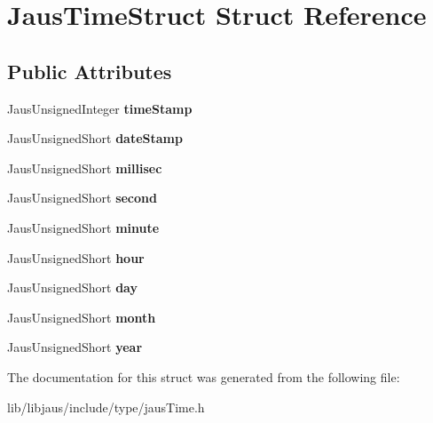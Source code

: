 \hypertarget{struct_jaus_time_struct}{\section{\-Jaus\-Time\-Struct \-Struct \-Reference}
\label{struct_jaus_time_struct}
}
\subsection*{\-Public \-Attributes}
\begin{DoxyCompactItemize}
\item 
\hypertarget{struct_jaus_time_struct_a82ba26a6bb3bb985523fababeae29d81}{\-Jaus\-Unsigned\-Integer {\bfseries time\-Stamp}}\label{struct_jaus_time_struct_a82ba26a6bb3bb985523fababeae29d81}

\item 
\hypertarget{struct_jaus_time_struct_ac4fcc4d01b47ac2499cf04eb2d14e44d}{\-Jaus\-Unsigned\-Short {\bfseries date\-Stamp}}\label{struct_jaus_time_struct_ac4fcc4d01b47ac2499cf04eb2d14e44d}

\item 
\hypertarget{struct_jaus_time_struct_a1d202afc258ba1c214dc7af2eeb894d9}{\-Jaus\-Unsigned\-Short {\bfseries millisec}}\label{struct_jaus_time_struct_a1d202afc258ba1c214dc7af2eeb894d9}

\item 
\hypertarget{struct_jaus_time_struct_afe63f8e9ad064bab7132d67e0407fcc1}{\-Jaus\-Unsigned\-Short {\bfseries second}}\label{struct_jaus_time_struct_afe63f8e9ad064bab7132d67e0407fcc1}

\item 
\hypertarget{struct_jaus_time_struct_a583cfb3ad1bf1a51ac972714ff051f52}{\-Jaus\-Unsigned\-Short {\bfseries minute}}\label{struct_jaus_time_struct_a583cfb3ad1bf1a51ac972714ff051f52}

\item 
\hypertarget{struct_jaus_time_struct_ab1562d7a1876ed04d388716587e35ab6}{\-Jaus\-Unsigned\-Short {\bfseries hour}}\label{struct_jaus_time_struct_ab1562d7a1876ed04d388716587e35ab6}

\item 
\hypertarget{struct_jaus_time_struct_ac0b2d9273125ed2bf057edac8ae95df1}{\-Jaus\-Unsigned\-Short {\bfseries day}}\label{struct_jaus_time_struct_ac0b2d9273125ed2bf057edac8ae95df1}

\item 
\hypertarget{struct_jaus_time_struct_a12c7298788d574ce43adcf3d13875874}{\-Jaus\-Unsigned\-Short {\bfseries month}}\label{struct_jaus_time_struct_a12c7298788d574ce43adcf3d13875874}

\item 
\hypertarget{struct_jaus_time_struct_af7b6de9a57a99d6035c9a9826dea65b2}{\-Jaus\-Unsigned\-Short {\bfseries year}}\label{struct_jaus_time_struct_af7b6de9a57a99d6035c9a9826dea65b2}

\end{DoxyCompactItemize}


\-The documentation for this struct was generated from the following file\-:\begin{DoxyCompactItemize}
\item 
lib/libjaus/include/type/jaus\-Time.\-h\end{DoxyCompactItemize}
